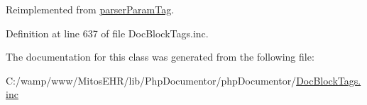 \-Reimplemented from \hyperlink{classparser_param_tag_a4a925d6b38bcf3957c713a7d3dc7da1f}{parser\-Param\-Tag}.



\-Definition at line 637 of file \-Doc\-Block\-Tags.\-inc.



\-The documentation for this class was generated from the following file\-:\begin{DoxyCompactItemize}
\item 
\-C\-:/wamp/www/\-Mitos\-E\-H\-R/lib/\-Php\-Documentor/php\-Documentor/\hyperlink{_doc_block_tags_8inc}{\-Doc\-Block\-Tags.\-inc}\end{DoxyCompactItemize}
